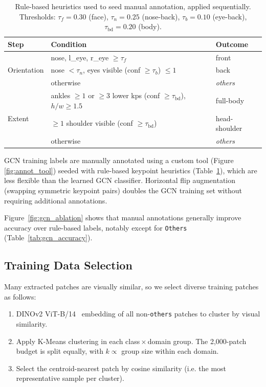 \begin{table}[h]
  \centering
  \caption{Rule-based heuristics used to seed manual annotation, applied sequentially.
           Thresholds: $\tau_f{=}0.30$ (face), $\tau_n{=}0.25$ (nose-back), $\tau_b{=}0.10$ (eye-back), $\tau_{\text{bd}}{=}0.20$ (body).}
  \label{tab:rules}
  \begin{tabular}{lll}
    \toprule
    Step & Condition & Outcome \\
    \midrule
    \multirow{3}{*}{Orientation}
      & nose, l\_eye, r\_eye $\geq \tau_f$                              & front \\
      & nose $< \tau_n$, eyes visible (conf $\geq \tau_b$) $\leq 1$    & back  \\
      & otherwise                                                        & \textit{others} \\
    \midrule
    \multirow{3}{*}{Extent}
      & ankles $\geq 1$ or $\geq 3$ lower kps (conf $\geq \tau_{\text{bd}}$), $h/w \geq 1.5$ & full-body \\
      & $\geq 1$ shoulder visible (conf $\geq \tau_{\text{bd}}$)                               & head-shoulder \\
      & otherwise                                                                               & \textit{others} \\
    \bottomrule
  \end{tabular}
\end{table}

GCN training labels are manually annotated using a custom tool (Figure \ref{fig:annot_tool}) seeded with rule-based keypoint heuristics (Table~\ref{tab:rules}), which are less flexible than the learned GCN classifier. Horizontal flip augmentation (swapping symmetric keypoint pairs) doubles the GCN training set without requiring additional annotations.

Figure~\ref{fig:gcn_ablation} shows that manual annotations generally improve accuracy over rule-based labels, notably except for \texttt {Others} (Table~\ref{tab:gcn_accuracy}).

\subsection{Training Data Selection}


Many extracted patches are visually similar, so we select diverse training patches as follows:
\begin{enumerate}
    \item DINOv2 ViT-B/14~\cite{oquab2023dinov2, darcet2023vitneedreg, jose2024dinov2meetstextunified}
          embedding of all non-\texttt{others} patches to cluster by visual similarity.
    \item Apply K-Means clustering in each class\,$\times$\,domain group. The 2,000-patch budget
          is split equally, with $k \propto$ group size
          within each domain.
    \item Select the centroid-nearest patch by cosine similarity (i.e. the most representative sample per cluster).
\end{enumerate}

